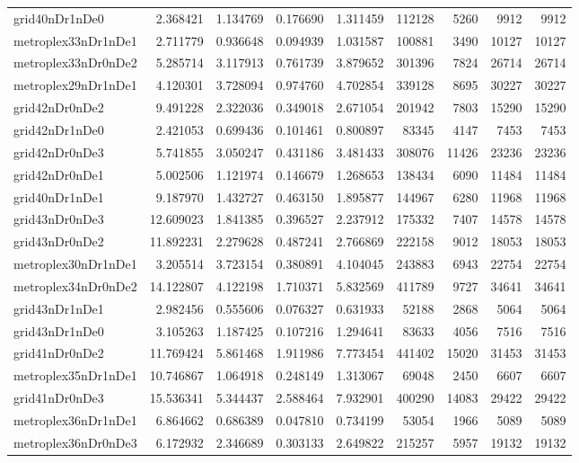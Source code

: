 \begin{longtable}{|l|r|r|r|r|r|r|r|r|}
grid40nDr1nDe0 & 2.368421 & 1.134769 & 0.176690 & 1.311459 & 112128 & 5260 & 9912 & 9912 \\
metroplex33nDr1nDe1 & 2.711779 & 0.936648 & 0.094939 & 1.031587 & 100881 & 3490 & 10127 & 10127 \\
metroplex33nDr0nDe2 & 5.285714 & 3.117913 & 0.761739 & 3.879652 & 301396 & 7824 & 26714 & 26714 \\
metroplex29nDr1nDe1 & 4.120301 & 3.728094 & 0.974760 & 4.702854 & 339128 & 8695 & 30227 & 30227 \\
grid42nDr0nDe2 & 9.491228 & 2.322036 & 0.349018 & 2.671054 & 201942 & 7803 & 15290 & 15290 \\
grid42nDr1nDe0 & 2.421053 & 0.699436 & 0.101461 & 0.800897 & 83345 & 4147 & 7453 & 7453 \\
grid42nDr0nDe3 & 5.741855 & 3.050247 & 0.431186 & 3.481433 & 308076 & 11426 & 23236 & 23236 \\
grid42nDr0nDe1 & 5.002506 & 1.121974 & 0.146679 & 1.268653 & 138434 & 6090 & 11484 & 11484 \\
grid40nDr1nDe1 & 9.187970 & 1.432727 & 0.463150 & 1.895877 & 144967 & 6280 & 11968 & 11968 \\
grid43nDr0nDe3 & 12.609023 & 1.841385 & 0.396527 & 2.237912 & 175332 & 7407 & 14578 & 14578 \\
grid43nDr0nDe2 & 11.892231 & 2.279628 & 0.487241 & 2.766869 & 222158 & 9012 & 18053 & 18053 \\
metroplex30nDr1nDe1 & 3.205514 & 3.723154 & 0.380891 & 4.104045 & 243883 & 6943 & 22754 & 22754 \\
metroplex34nDr0nDe2 & 14.122807 & 4.122198 & 1.710371 & 5.832569 & 411789 & 9727 & 34641 & 34641 \\
grid43nDr1nDe1 & 2.982456 & 0.555606 & 0.076327 & 0.631933 & 52188 & 2868 & 5064 & 5064 \\
grid43nDr1nDe0 & 3.105263 & 1.187425 & 0.107216 & 1.294641 & 83633 & 4056 & 7516 & 7516 \\
grid41nDr0nDe2 & 11.769424 & 5.861468 & 1.911986 & 7.773454 & 441402 & 15020 & 31453 & 31453 \\
metroplex35nDr1nDe1 & 10.746867 & 1.064918 & 0.248149 & 1.313067 & 69048 & 2450 & 6607 & 6607 \\
grid41nDr0nDe3 & 15.536341 & 5.344437 & 2.588464 & 7.932901 & 400290 & 14083 & 29422 & 29422 \\
metroplex36nDr1nDe1 & 6.864662 & 0.686389 & 0.047810 & 0.734199 & 53054 & 1966 & 5089 & 5089 \\
metroplex36nDr0nDe3 & 6.172932 & 2.346689 & 0.303133 & 2.649822 & 215257 & 5957 & 19132 & 19132 \\

\end{longtable}
